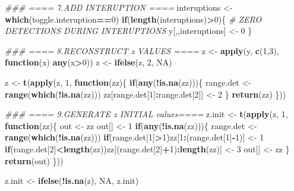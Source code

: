 \documentclass[
]{article}
\newenvironment{Shaded}{\begin{snugshade}}{\end{snugshade}}
\newcommand{\CommentTok}[1]{\textcolor[rgb]{0.56,0.35,0.01}{\textit{#1}}}
\newcommand{\ControlFlowTok}[1]{\textcolor[rgb]{0.13,0.29,0.53}{\textbf{#1}}}
\newcommand{\DecValTok}[1]{\textcolor[rgb]{0.00,0.00,0.81}{#1}}
\newcommand{\KeywordTok}[1]{\textcolor[rgb]{0.13,0.29,0.53}{\textbf{#1}}}
\newcommand{\NormalTok}[1]{#1}
\newcommand{\OperatorTok}[1]{\textcolor[rgb]{0.81,0.36,0.00}{\textbf{#1}}}
\newcommand{\OtherTok}[1]{\textcolor[rgb]{0.56,0.35,0.01}{#1}}
\newcommand{\StringTok}[1]{\textcolor[rgb]{0.31,0.60,0.02}{#1}}
\begin{document}
\begin{Shaded}
\begin{Highlighting}[]
\CommentTok{### ==== 7.ADD INTERUPTION ====}
\NormalTok{interuptions <-}\StringTok{ }\KeywordTok{which}\NormalTok{(toggle.interuption}\OperatorTok{==}\DecValTok{0}\NormalTok{)}
\ControlFlowTok{if}\NormalTok{(}\KeywordTok{length}\NormalTok{(interuptions)}\OperatorTok{>}\DecValTok{0}\NormalTok{)\{}
   \CommentTok{# ZERO DETECTIONS DURING INTERUPTIONS}
\NormalTok{   y[,,interuptions] <-}\StringTok{ }\DecValTok{0}
\NormalTok{\}}

\CommentTok{### ==== 8.RECONSTRUCT z VALUES ====}
\NormalTok{z <-}\StringTok{ }\KeywordTok{apply}\NormalTok{(y, }\KeywordTok{c}\NormalTok{(}\DecValTok{1}\NormalTok{,}\DecValTok{3}\NormalTok{), }\ControlFlowTok{function}\NormalTok{(x) }\KeywordTok{any}\NormalTok{(x}\OperatorTok{>}\DecValTok{0}\NormalTok{))}
\NormalTok{z <-}\StringTok{ }\KeywordTok{ifelse}\NormalTok{(z, }\DecValTok{2}\NormalTok{, }\OtherTok{NA}\NormalTok{)}

\NormalTok{z <-}\StringTok{ }\KeywordTok{t}\NormalTok{(}\KeywordTok{apply}\NormalTok{(z, }\DecValTok{1}\NormalTok{, }\ControlFlowTok{function}\NormalTok{(zz)\{}
   \ControlFlowTok{if}\NormalTok{(}\KeywordTok{any}\NormalTok{(}\OperatorTok{!}\KeywordTok{is.na}\NormalTok{(zz)))\{}
\NormalTok{      range.det <-}\StringTok{ }\KeywordTok{range}\NormalTok{(}\KeywordTok{which}\NormalTok{(}\OperatorTok{!}\KeywordTok{is.na}\NormalTok{(zz)))}
\NormalTok{      zz[range.det[}\DecValTok{1}\NormalTok{]}\OperatorTok{:}\NormalTok{range.det[}\DecValTok{2}\NormalTok{]] <-}\StringTok{ }\DecValTok{2}
\NormalTok{   \}}
   \KeywordTok{return}\NormalTok{(zz)}
\NormalTok{\}))}

\CommentTok{### ==== 9.GENERATE z INITIAL values====}
\NormalTok{z.init <-}\StringTok{ }\KeywordTok{t}\NormalTok{(}\KeywordTok{apply}\NormalTok{(z, }\DecValTok{1}\NormalTok{, }\ControlFlowTok{function}\NormalTok{(zz)\{}
\NormalTok{   out <-}\StringTok{ }\NormalTok{zz}
\NormalTok{   out[] <-}\StringTok{ }\DecValTok{1}
   \ControlFlowTok{if}\NormalTok{(}\KeywordTok{any}\NormalTok{(}\OperatorTok{!}\KeywordTok{is.na}\NormalTok{(zz)))\{}
\NormalTok{      range.det <-}\StringTok{ }\KeywordTok{range}\NormalTok{(}\KeywordTok{which}\NormalTok{(}\OperatorTok{!}\KeywordTok{is.na}\NormalTok{(zz)))}
      \ControlFlowTok{if}\NormalTok{(range.det[}\DecValTok{1}\NormalTok{]}\OperatorTok{>}\DecValTok{1}\NormalTok{)zz[}\DecValTok{1}\OperatorTok{:}\NormalTok{(range.det[}\DecValTok{1}\NormalTok{]}\OperatorTok{-}\DecValTok{1}\NormalTok{)] <-}\StringTok{ }\DecValTok{1}
      \ControlFlowTok{if}\NormalTok{(range.det[}\DecValTok{2}\NormalTok{]}\OperatorTok{<}\KeywordTok{length}\NormalTok{(zz))zz[(range.det[}\DecValTok{2}\NormalTok{]}\OperatorTok{+}\DecValTok{1}\NormalTok{)}\OperatorTok{:}\KeywordTok{length}\NormalTok{(zz)] <-}\StringTok{ }\DecValTok{3}
\NormalTok{      out[] <-}\StringTok{ }\NormalTok{zz}
\NormalTok{   \} }
   \KeywordTok{return}\NormalTok{(out)}
\NormalTok{\}))}

\NormalTok{z.init <-}\StringTok{ }\KeywordTok{ifelse}\NormalTok{(}\OperatorTok{!}\KeywordTok{is.na}\NormalTok{(z), }\OtherTok{NA}\NormalTok{, z.init)}
\end{Highlighting}
\end{Shaded}
\end{document}
